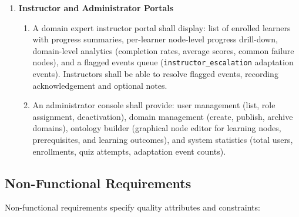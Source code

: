 \begin{enumerate}
    \item[\textbf{FR13:}] \textbf{Instructor and Administrator Portals}
        \begin{enumerate}
            \item[\textbf{FR13.1:}] A domain expert instructor portal shall display: list of enrolled learners with progress summaries, per-learner node-level progress drill-down, domain-level analytics (completion rates, average scores, common failure nodes), and a flagged events queue (\texttt{instructor\_escalation} adaptation events). Instructors shall be able to resolve flagged events, recording acknowledgement and optional notes.
            \item[\textbf{FR13.2:}] An administrator console shall provide: user management (list, role assignment, deactivation), domain management (create, publish, archive domains), ontology builder (graphical node editor for learning nodes, prerequisites, and learning outcomes), and system statistics (total users, enrollments, quiz attempts, adaptation event counts).
        \end{enumerate}
\end{enumerate}

\subsection*{Non-Functional Requirements}

Non-functional requirements specify quality attributes and constraints:

